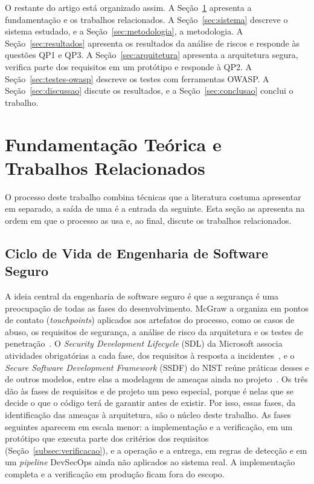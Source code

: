 \documentclass[conference]{IEEEtran}
\begin{document}
O restante do artigo está organizado assim. A Seção~\ref{sec:fundamentacao} apresenta a fundamentação e os trabalhos relacionados. A Seção~\ref{sec:sistema} descreve o sistema estudado, e a Seção~\ref{sec:metodologia}, a metodologia. A Seção~\ref{sec:resultados} apresenta os resultados da análise de riscos e responde às questões QP1 e QP3. A Seção~\ref{sec:arquitetura} apresenta a arquitetura segura, verifica parte dos requisitos em um protótipo e responde à QP2. A Seção~\ref{sec:testes-owasp} descreve os testes com ferramentas OWASP. A Seção~\ref{sec:discussao} discute os resultados, e a Seção~\ref{sec:conclusao} conclui o trabalho.

\section{Fundamentação Teórica e Trabalhos Relacionados}
\label{sec:fundamentacao}

O processo deste trabalho combina técnicas que a literatura costuma apresentar em separado, a saída de uma é a entrada da seguinte. Esta seção as apresenta na ordem em que o processo as usa e, ao final, discute os trabalhos relacionados.

\subsection{Ciclo de Vida de Engenharia de Software Seguro}

A ideia central da engenharia de software seguro é que a segurança é uma preocupação de todas as fases do desenvolvimento. McGraw a organiza em pontos de contato (\textit{touchpoints}) aplicados aos artefatos do processo, como os casos de abuso, os requisitos de segurança, a análise de risco da arquitetura e os testes de penetração~\cite{mcgraw2006}. O \textit{Security Development Lifecycle} (SDL) da Microsoft associa atividades obrigatórias a cada fase, dos requisitos à resposta a incidentes~\cite{howard2006}, e o \textit{Secure Software Development Framework} (SSDF) do NIST reúne práticas desses e de outros modelos, entre elas a modelagem de ameaças ainda no projeto~\cite{nist2022ssdf}. Os três dão às fases de requisitos e de projeto um peso especial, porque é nelas que se decide o que o código terá de garantir antes de existir. Por isso, essas fases, da identificação das ameaças à arquitetura, são o núcleo deste trabalho. As fases seguintes aparecem em escala menor: a implementação e a verificação, em um protótipo que executa parte dos critérios dos requisitos (Seção~\ref{subsec:verificacao}), e a operação e a entrega, em regras de detecção e em um \textit{pipeline} DevSecOps ainda não aplicados ao sistema real. A implementação completa e a verificação em produção ficam fora do escopo.
\end{document}
